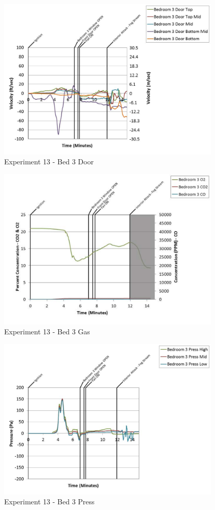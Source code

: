 \documentclass{article}
\begin{document}
\begin{appendices}
	\begin{figure}[h!]
		\centering
		\includegraphics[height=3.05in]{0_Images/Results_Charts/Exp_13_Charts/Bed3Door.pdf}
		\caption{Experiment 13 - Bed 3 Door}
	\end{figure}
 
	\clearpage

	\begin{figure}[h!]
		\centering
		\includegraphics[height=3.05in]{0_Images/Results_Charts/Exp_13_Charts/Bed3Gas.pdf}
		\caption{Experiment 13 - Bed 3 Gas}
	\end{figure}
 

	\begin{figure}[h!]
		\centering
		\includegraphics[height=3.05in]{0_Images/Results_Charts/Exp_13_Charts/Bed3Press.pdf}
		\caption{Experiment 13 - Bed 3 Press}
	\end{figure}
 

\end{appendices}
\end{document}
